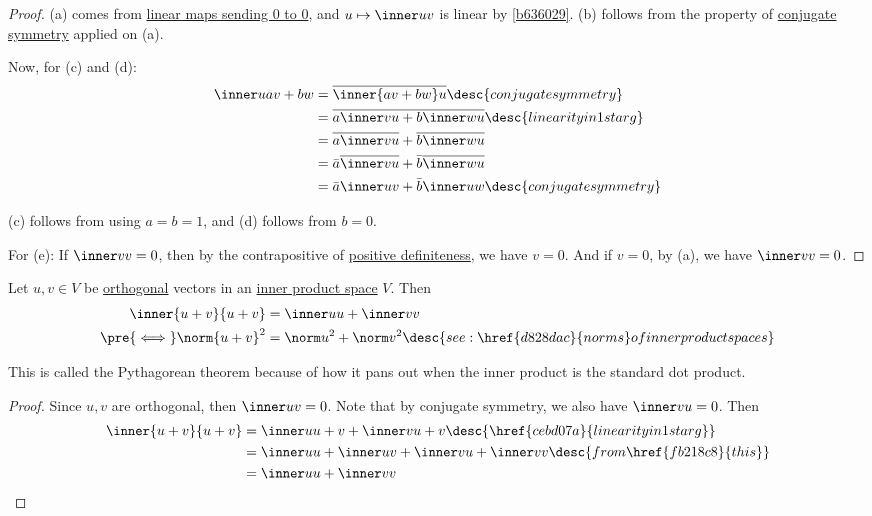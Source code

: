 \begin{proof}
  (a) comes from \href{c5eb127}{linear maps sending 0 to 0}, and $u\mapsto
  \inner uv$ is linear by \autoref{b636029}. (b) follows from the property of
  \href{cebd07a}{conjugate symmetry} applied on (a).

  Now, for (c) and (d):
  \begin{align*}
    \inner u{av+bw} &=\overline{\inner{av+bw}u}\desc{conjugate symmetry}          \\
                    &=\overline{a\inner vu+b\inner wu}\desc{linearity in 1st arg} \\
                    &=\overline{a\inner vu}+\overline{b\inner wu}                 \\
                    &=\bar a\overline{\inner vu}+\bar b\overline{\inner wu}       \\
                    &=\bar a\inner uv+\bar b\inner uw\desc{conjugate symmetry}
  \end{align*}

  (c) follows from using $a=b=1$, and (d) follows from $b=0$.

  For (e): If $\inner vv=0$, then by the contrapositive of
  \href{cebd07a}{positive definiteness}, we have $v=0$. And if $v=0$, by (a),
  we have $\inner vv=0$.
\end{proof}

\label{c5e5d7d}

Let $u,v\in V$ be \href{d9735e5}{orthogonal} vectors in an \href{b9935c8}{inner
product space} $V$. Then
\begin{align*}
  \inner{u+v}{u+v}       &=\inner uu+\inner vv                                                          \\
  \pre{\iff}\norm{u+v}^2 &=\norm u^2+\norm v^2\desc{see: \href{d828dac}{norms} of inner product spaces}
\end{align*}

This is called the Pythagorean theorem because of how it pans out when the
inner product is the standard dot product.

\begin{proof}
  Since $u,v$ are orthogonal, then $\inner uv=0$. Note that by conjugate
  symmetry, we also have $\inner vu=0$. Then
  \begin{align*}
    \inner{u+v}{u+v} &=\inner u{u+v}+\inner v{u+v}\desc{\href{cebd07a}{linearity in 1st arg}}  \\
                     &=\inner uu+\inner uv+\inner vu+\inner vv\desc{from \href{fb218c8}{this}} \\
                     &=\inner uu+\inner vv
  \end{align*}
\end{proof}

